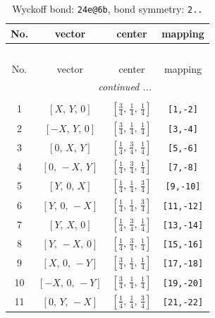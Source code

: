 \documentclass[fleqn,8pt]{jsarticle}
\begin{document}
\begin{longtable}{cccc}
\caption{Wyckoff bond: {\tt 24e@6b}, bond symmetry: {\tt 2..}}
 \\
 \hline \hline
No. & vector & center & mapping \\ \hline \endfirsthead

\multicolumn{3}{l}{\tablename\ \thetable{}} \\
 \hline \hline
No. & vector & center & mapping \\ \hline \endhead

 \hline \hline
\multicolumn{3}{r}{\footnotesize\it continued ...} \\ \endfoot

 \hline \hline
\multicolumn{3}{r}{} \\ \endlastfoot

1 & $\left[ X,\, Y,\, 0 \right]$ & $\left[ \frac{3}{4},\, \frac{1}{4},\, \frac{1}{4} \right]$ & {\tt [1,-2]} \\ \hline
2 & $\left[ - X,\, Y,\, 0 \right]$ & $\left[ \frac{3}{4},\, \frac{1}{4},\, \frac{1}{4} \right]$ & {\tt [3,-4]} \\ \hline
3 & $\left[ 0,\, X,\, Y \right]$ & $\left[ \frac{1}{4},\, \frac{3}{4},\, \frac{1}{4} \right]$ & {\tt [5,-6]} \\ \hline
4 & $\left[ 0,\, - X,\, Y \right]$ & $\left[ \frac{1}{4},\, \frac{3}{4},\, \frac{1}{4} \right]$ & {\tt [7,-8]} \\ \hline
5 & $\left[ Y,\, 0,\, X \right]$ & $\left[ \frac{1}{4},\, \frac{1}{4},\, \frac{3}{4} \right]$ & {\tt [9,-10]} \\ \hline
6 & $\left[ Y,\, 0,\, - X \right]$ & $\left[ \frac{1}{4},\, \frac{1}{4},\, \frac{3}{4} \right]$ & {\tt [11,-12]} \\ \hline
7 & $\left[ Y,\, X,\, 0 \right]$ & $\left[ \frac{1}{4},\, \frac{3}{4},\, \frac{1}{4} \right]$ & {\tt [13,-14]} \\ \hline
8 & $\left[ Y,\, - X,\, 0 \right]$ & $\left[ \frac{1}{4},\, \frac{3}{4},\, \frac{1}{4} \right]$ & {\tt [15,-16]} \\ \hline
9 & $\left[ X,\, 0,\, - Y \right]$ & $\left[ \frac{3}{4},\, \frac{1}{4},\, \frac{1}{4} \right]$ & {\tt [17,-18]} \\ \hline
10 & $\left[ - X,\, 0,\, - Y \right]$ & $\left[ \frac{3}{4},\, \frac{1}{4},\, \frac{1}{4} \right]$ & {\tt [19,-20]} \\ \hline
11 & $\left[ 0,\, Y,\, - X \right]$ & $\left[ \frac{1}{4},\, \frac{1}{4},\, \frac{3}{4} \right]$ & {\tt [21,-22]} \\ \hline

\end{longtable}
\end{document}
